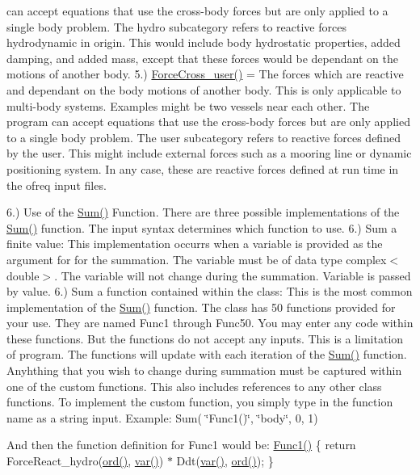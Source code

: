 can accept equations that use the cross-\/body forces but are only applied to a single body problem. The hydro subcategory refers to reactive forces hydrodynamic in origin. This would include body hydrostatic properties, added damping, and added mass, except that these forces would be dependant on the motions of another body. 5.) \hyperlink{classosea_1_1ofreq_1_1_equationof_motion_a3b06b1ff4b792ad3a3d3c0274426d5ed}{Force\-Cross\-\_\-user()} = The forces which are reactive and dependant on the body motions of another body. This is only applicable to multi-\/body systems. Examples might be two vessels near each other. The program can accept equations that use the cross-\/body forces but are only applied to a single body problem. The user subcategory refers to reactive forces defined by the user. This might include external forces such as a mooring line or dynamic positioning system. In any case, these are reactive forces defined at run time in the ofreq input files.

6.) Use of the \hyperlink{classosea_1_1ofreq_1_1_equationof_motion_a5907d782ee639d5ec24515ed21050851}{Sum()} Function. There are three possible implementations of the \hyperlink{classosea_1_1ofreq_1_1_equationof_motion_a5907d782ee639d5ec24515ed21050851}{Sum()} function. The input syntax determines which function to use. 6.) Sum a finite value\-: This implementation occurrs when a variable is provided as the argument for for the summation. The variable must be of data type complex$<$double$>$. The variable will not change during the summation. Variable is passed by value. 6.) Sum a function contained within the class\-: This is the most common implementation of the \hyperlink{classosea_1_1ofreq_1_1_equationof_motion_a5907d782ee639d5ec24515ed21050851}{Sum()} function. The class has 50 functions provided for your use. They are named Func1 through Func50. You may enter any code within these functions. But the functions do not accept any inputs. This is a limitation of program. The functions will update with each iteration of the \hyperlink{classosea_1_1ofreq_1_1_equationof_motion_a5907d782ee639d5ec24515ed21050851}{Sum()} function. Anyhthing that you wish to change during summation must be captured within one of the custom functions. This also includes references to any other class functions. To implement the custom function, you simply type in the function name as a string input. Example\-: Sum( \char`\"{}\-Func1()\char`\"{}, \char`\"{}body\char`\"{}, 0, 1)

And then the function definition for Func1 would be\-: \hyperlink{classosea_1_1ofreq_1_1_eqn_translation_a147be15e86663c1af76ca2ecaeece82d}{Func1()} \{ return Force\-React\-\_\-hydro(\hyperlink{classosea_1_1ofreq_1_1_equationof_motion_a31f904818ce75c9e2a2b5cff9fc707a5}{ord()}, \hyperlink{classosea_1_1ofreq_1_1_equationof_motion_ab69511cc5037376cf7da80ce30d9eaab}{var()}) $\ast$ Ddt(\hyperlink{classosea_1_1ofreq_1_1_equationof_motion_ab69511cc5037376cf7da80ce30d9eaab}{var()}, \hyperlink{classosea_1_1ofreq_1_1_equationof_motion_a31f904818ce75c9e2a2b5cff9fc707a5}{ord()}); \}


